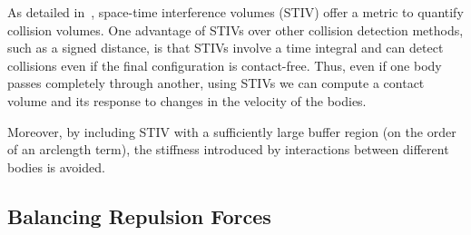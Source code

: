 \documentclass[preprint, 10pt]{elsarticle}
\begin{document}

As detailed in~\cite{Lu2017, Harmon2011}, space-time interference
volumes (STIV) offer a metric to quantify collision volumes. One
advantage of STIVs over other collision detection methods, such as a
signed distance, is that STIVs involve a time integral and can detect
collisions even if the final configuration is contact-free. Thus, even
if one body passes completely through another, using STIVs we can
compute a contact volume and its response to changes in the velocity of
the bodies.

Moreover, by including STIV with a sufficiently large buffer
region (on the order of an arclength term), the stiffness introduced by
interactions between different bodies is avoided. 


\subsection{Balancing Repulsion Forces}

\end{document}

